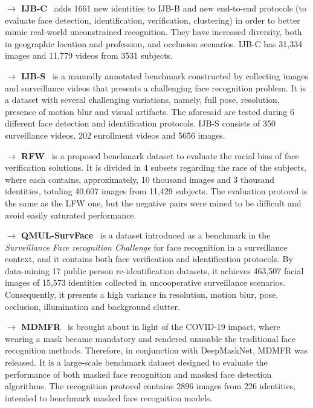 \documentclass[class=report, crop=false, a4paper, 12pt]{standalone}
\begin{document}
\begin{appendix}
\vspace{0.7\baselineskip}
\noindent\textbf{$\rightarrow$ IJB-C}~\autocite{mazeIARPAJanusBenchmark2018} adds 1661 new identities to IJB-B and new end-to-end protocols (to evaluate face detection, identification, verification, clustering) in order to better mimic real-world unconstrained recognition. They have increased diversity, both in geographic location and profession, and occlusion scenarios. IJB-C has 31,334 images and 11,779 videos from 3531 subjects.

\vspace{0.7\baselineskip}
\noindent\textbf{$\rightarrow$ IJB-S}~\autocite{kalkaIJBIARPAJanus2018} is a manually annotated benchmark constructed by collecting images and surveillance videos that presents a challenging face recognition problem. It is a dataset with several challenging variations, namely, full pose, resolution, presence of motion blur and visual artifacts. The aforesaid are tested during 6 different face detection and identification protocols. IJB-S consists of 350 surveillance videos, 202 enrollment videos and 5656 images. 

\vspace{0.7\baselineskip}
\noindent\textbf{$\rightarrow$ RFW}~\autocite{wangRacialFacesWild2019} is a proposed benchmark dataset to evaluate the racial bias of face verification solutions. It is divided in 4 subsets regarding the race of the subjects, where each contains, approximately, 10 thousand images and 3 thousand identities, totaling 40,607 images from 11,429 subjects. The evaluation protocol is the same as the LFW one, but the negative pairs were mined to be difficult and avoid easily saturated performance.

\vspace{0.7\baselineskip}
\noindent\textbf{$\rightarrow$ QMUL-SurvFace}~\autocite{chengSurveillanceFaceRecognition2018} is a dataset introduced as a benchmark in the \textit{Surveillance Face recognition Challenge} for face recognition in a surveillance context, and it contains both face verification and identification protocols. By data-mining 17 public person re-identification datasets, it achieves 463,507 facial images of 15,573 identities collected in uncooperative surveillance scenarios. Consequently, it presents a high variance in resolution, motion blur, pose, occlusion, illumination and background clutter.

\vspace{0.7\baselineskip}
\noindent\textbf{$\rightarrow$ MDMFR}~\autocite{ullahNovelDeepMaskNetModel2022} is brought about in light of the COVID-19 impact, where wearing a mask became mandatory and rendered unusable the traditional face recognition methods. Therefore, in conjunction with DeepMaskNet, MDMFR was released. It is a large-scale benchmark dataset designed to evaluate the performance of both masked face recognition and masked face detection algorithms. The recognition protocol contains 2896 images from 226 identities, intended to benchmark masked face recognition models.


\end{appendix}
\end{document}
